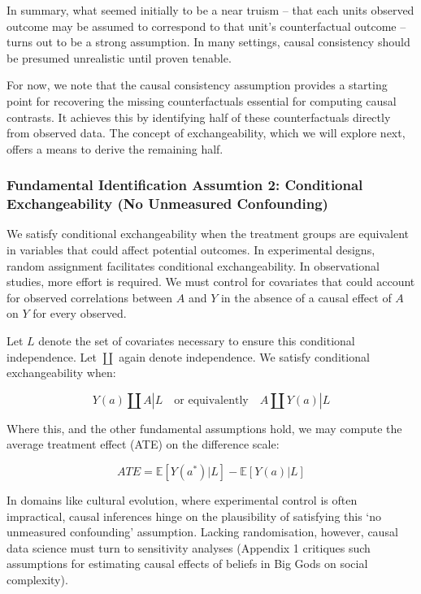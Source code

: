 \documentclass[
  singlecolumn,
  9pt]{article}
\begin{document}
In summary, what seemed initially to be a near truism -- that each units
observed outcome may be assumed to correspond to that unit's
counterfactual outcome -- turns out to be a strong assumption. In many
settings, causal consistency should be presumed unrealistic until proven
tenable.

For now, we note that the causal consistency assumption provides a
starting point for recovering the missing counterfactuals essential for
computing causal contrasts. It achieves this by identifying half of
these counterfactuals directly from observed data. The concept of
exchangeability, which we will explore next, offers a means to derive
the remaining half.

\subsubsection{Fundamental Identification Assumtion 2: Conditional
Exchangeability (No Unmeasured
Confounding)}\label{fundamental-identification-assumtion-2-conditional-exchangeability-no-unmeasured-confounding}

We satisfy conditional exchangeability when the treatment groups are
equivalent in variables that could affect potential outcomes. In
experimental designs, random assignment facilitates conditional
exchangeability. In observational studies, more effort is required. We
must control for covariates that could account for observed correlations
between \(A\) and \(Y\) in the absence of a causal effect of \(A\) on
\(Y\) for every observed.

Let \(L\) denote the set of covariates necessary to ensure this
conditional independence. Let \(\coprod\) again denote independence. We
satisfy conditional exchangeability when:

\[
Y(a) \coprod A | L \quad \text{or equivalently} \quad A \coprod Y(a) | L
\]

Where this, and the other fundamental assumptions hold, we may compute
the average treatment effect (ATE) on the difference scale:

\[
ATE = \mathbb{E}[Y(a^*) | L] - \mathbb{E}[Y(a) | L]
\]

In domains like cultural evolution, where experimental control is often
impractical, causal inferences hinge on the plausibility of satisfying
this `no unmeasured confounding' assumption. Lacking randomisation,
however, causal data science must turn to sensitivity analyses (Appendix
1 critiques such assumptions for estimating causal effects of beliefs in
Big Gods on social complexity).
\end{document}
